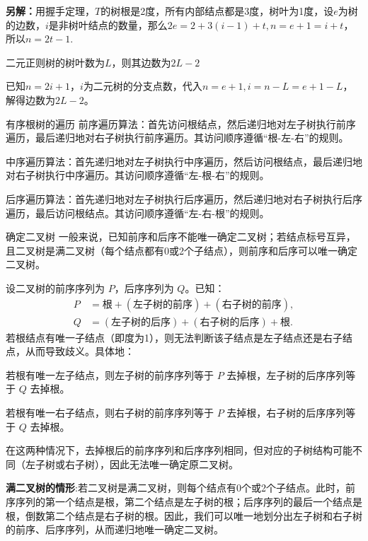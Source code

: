 \documentclass[lang=cn,11pt]{elegantbook}
\begin{document}
\textbf{另解：}用握手定理，$T$的树根是2度，所有内部结点都是3度，树叶为1度，设$e$为树的边数，$i$是非树叶结点的数量，那么$2e=2+3(i-1)+t,n=e+1=i+t$，所以$n=2t-1$.
\begin{example}
    二元正则树的树叶数为$L$，则其边数为$2L-2$
\end{example}
已知$n=2i+1$，$i$为二元树的分支点数，代入$n=e+1,i=n-L=e+1-L$，解得边数为$2L-2$。
\begin{definition}{有序根树的遍历}
前序遍历算法：首先访问根结点，然后递归地对左子树执行前序遍历，最后递归地对右子树执行前序遍历。其访问顺序遵循“根-左-右”的规则。

中序遍历算法：首先递归地对左子树执行中序遍历，然后访问根结点，最后递归地对右子树执行中序遍历。其访问顺序遵循“左-根-右”的规则。

后序遍历算法：首先递归地对左子树执行后序遍历，然后递归地对右子树执行后序遍历，最后访问根结点。其访问顺序遵循“左-右-根”的规则。
\end{definition}
\begin{theorem}{确定二叉树}
    一般来说，已知前序和后序不能唯一确定二叉树；若结点标号互异，且二叉树是满二叉树（每个结点都有0或2个子结点），则前序和后序可以唯一确定二叉树。
\end{theorem}
设二叉树的前序序列为 $P$，后序序列为 $Q$。已知：
    \begin{align*}
        P &= \text{根} + (\text{左子树的前序}) + (\text{右子树的前序}), \\
        Q &= (\text{左子树的后序}) + (\text{右子树的后序}) + \text{根}.
    \end{align*}
    若根结点有唯一子结点（即度为1），则无法判断该子结点是左子结点还是右子结点，从而导致歧义。具体地：
 
    若根有唯一左子结点，则左子树的前序序列等于 $P$ 去掉根，左子树的后序序列等于 $Q$ 去掉根。
      
    若根有唯一右子结点，则右子树的前序序列等于 $P$ 去掉根，右子树的后序序列等于 $Q$ 去掉根。
    
    在这两种情况下，去掉根后的前序序列和后序序列相同，但对应的子树结构可能不同（左子树或右子树），因此无法唯一确定原二叉树。

    \textbf{ 满二叉树的情形}:若二叉树是满二叉树，则每个结点有0个或2个子结点。此时，前序序列的第一个结点是根，第二个结点是左子树的根；后序序列的最后一个结点是根，倒数第二个结点是右子树的根。因此，我们可以唯一地划分出左子树和右子树的前序、后序序列，从而递归地唯一确定二叉树。

    \vspace{10pt}
\end{document}

